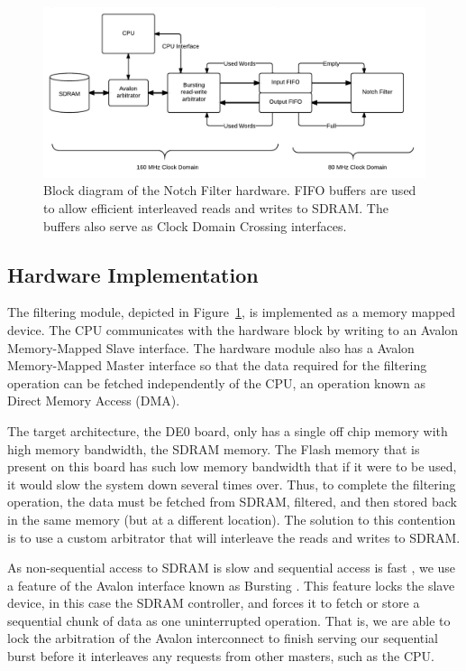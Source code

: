 \documentclass[]{article}
\begin{document}
\begin{landscape}
\begin{figure}[p]
	\begin{center}
		\includegraphics[width = 1.45\textwidth]{DSDNotch.pdf}
	\end{center}
	\caption{Block diagram of the Notch Filter hardware. FIFO buffers are used to allow efficient interleaved reads and writes to SDRAM. The buffers also serve as Clock Domain Crossing interfaces.}
	\label{fig:DSDNotch}
\end{figure}
\end{landscape}

\subsection{Hardware Implementation} %
\label{sub:hardware_implementation}

The filtering module, depicted in Figure~\ref{fig:DSDNotch}, is implemented as a memory mapped device. The CPU communicates with the hardware block by writing to an Avalon Memory-Mapped Slave interface.
The hardware module also has a Avalon Memory-Mapped Master interface so that the data required for the filtering operation can be fetched independently of the CPU, an operation known as Direct Memory Access (DMA).

The target architecture, the DE0 board, only has a single off chip memory with high memory bandwidth, the SDRAM memory. The Flash memory that is present on this board has such low memory bandwidth that if it were to be used, it would slow the system down several times over.
Thus, to complete the filtering operation, the data must be fetched from SDRAM, filtered, and then stored back in the same memory (but at a different location). The solution to this contention is to use a custom arbitrator that will interleave the reads and writes to SDRAM.

As non-sequential access to SDRAM is slow and sequential access is fast \cite{SDRAMDatasheet}, we use a feature of the Avalon interface known as Bursting \cite{AvalonSpec}. This feature locks the slave device, in this case the SDRAM controller, and forces it to fetch or store a sequential chunk of data as one uninterrupted operation.
That is, we are able to lock the arbitration of the Avalon interconnect to finish serving our sequential burst before it interleaves any requests from other masters, such as the CPU.
\end{document}
